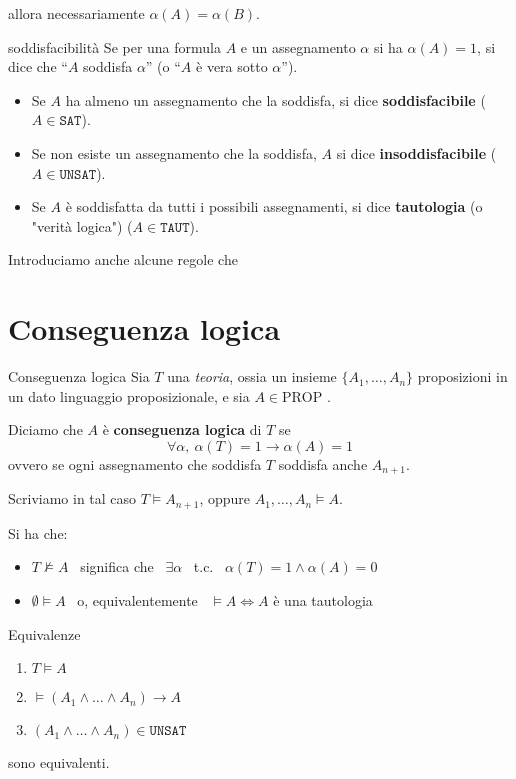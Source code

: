 \documentclass[a4paper,11pt]{report}
\begin{document}
allora necessariamente \( \alpha(A) = \alpha(B) \). 

\begin{gbox}[colframe=PineGreen]{soddisfacibilità}
    Se per una formula \( A \) e un assegnamento \( \alpha \) si ha \( \alpha (A) = 1 \), si dice che ``\(A \) soddisfa \( \alpha \)'' (o ``\( A \) è vera sotto \( \alpha \)'').
    \begin{itemize}
        \item Se \( A \) ha almeno un assegnamento che la soddisfa, si dice \textbf{soddisfacibile} (\( A \in \texttt{SAT} \)).
        \item Se non esiste un assegnamento che la soddisfa, \( A \) si dice \textbf{insoddisfacibile} (\( A \in \texttt{UNSAT} \)).
        \item Se \( A \) è soddisfatta da tutti i possibili assegnamenti, si dice \textbf{tautologia} (o "verità logica") (\( A \in \texttt{TAUT} \)).
    \end{itemize}
\end{gbox}

Introduciamo anche alcune regole che 

\section{Conseguenza logica}

\begin{defbox}{Conseguenza logica}{}
    Sia \( T \) una \textit{teoria}, ossia un insieme  \( \{A_1, \dots, A_n\} \) proposizioni in un dato linguaggio proposizionale, e sia \( A \in \text{PROP}\) .

    Diciamo che \( A \) è \textbf{conseguenza logica} di \( T\) se 
    \[ \forall \alpha,\ \alpha(T)=1 \to \alpha(A)=1 \] 
    ovvero se ogni assegnamento che soddisfa \(T\) soddisfa anche \( A_{n+1} \).

    Scriviamo in tal caso \(  T \vDash A_{n+1} \), oppure \( A_1, \dots, A_n \vDash A \).
\end{defbox}

Si ha che:
\begin{itemize}
    \item \(T \not\vDash A\) \ significa che \ \( \exists \alpha \) \ t.c. \ \( \alpha(T) = 1 \land \alpha(A) = 0 \)
    \item \( \emptyset \vDash A \) \ o, equivalentemente \ \( \vDash A \iff A\) è una tautologia
\end{itemize}

\begin{lemmabox}{Equivalenze}{}
    \begin{enumerate}
        \item \( T \vDash A \)
        \item \( \vDash (A_1 \land \dots \land A_n) \to A \)
        \item \( (A_1 \land \dots \land A_n) \in \texttt{UNSAT}\) 
    \end{enumerate}

    sono equivalenti.

\end{lemmabox}
\end{document}
